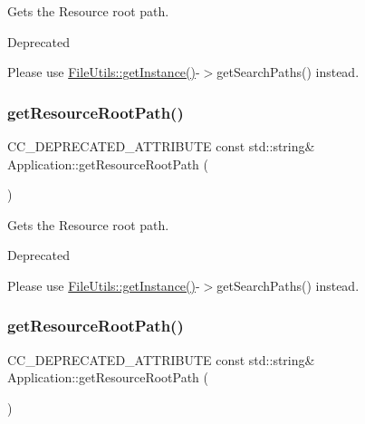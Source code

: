 Gets the Resource root path. \begin{DoxyRefDesc}{Deprecated}
\item[\hyperlink{deprecated__deprecated000356}{Deprecated}]Please use \hyperlink{classFileUtils_ac8ced4394d59f5459445ced27ccd0e8a}{File\+Utils\+::get\+Instance()}-\/$>$get\+Search\+Paths() instead. \end{DoxyRefDesc}
\mbox{\label{classApplication_a669e0584fa243449d87b17bc31d19113}} 
\subsubsection{\texorpdfstring{get\+Resource\+Root\+Path()}{getResourceRootPath()}\hspace{0.1cm}{\footnotesize\ttfamily [7/8]}}
{\footnotesize\ttfamily C\+C\+\_\+\+D\+E\+P\+R\+E\+C\+A\+T\+E\+D\+\_\+\+A\+T\+T\+R\+I\+B\+U\+TE const std\+::string\& Application\+::get\+Resource\+Root\+Path (\begin{DoxyParamCaption}\item[{void}]{ }\end{DoxyParamCaption})}

Gets the Resource root path. \begin{DoxyRefDesc}{Deprecated}
\item[\hyperlink{deprecated__deprecated000359}{Deprecated}]Please use \hyperlink{classFileUtils_ac8ced4394d59f5459445ced27ccd0e8a}{File\+Utils\+::get\+Instance()}-\/$>$get\+Search\+Paths() instead. \end{DoxyRefDesc}
\mbox{\label{classApplication_a669e0584fa243449d87b17bc31d19113}} 
\subsubsection{\texorpdfstring{get\+Resource\+Root\+Path()}{getResourceRootPath()}\hspace{0.1cm}{\footnotesize\ttfamily [8/8]}}
{\footnotesize\ttfamily C\+C\+\_\+\+D\+E\+P\+R\+E\+C\+A\+T\+E\+D\+\_\+\+A\+T\+T\+R\+I\+B\+U\+TE const std\+::string\& Application\+::get\+Resource\+Root\+Path (\begin{DoxyParamCaption}\item[{void}]{ }\end{DoxyParamCaption})}

